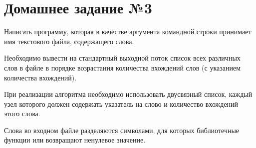\section*{Домашнее задание №3}


Написать программу, которая в качестве аргумента командной строки
принимает имя текстового файла, содержащего слова.

Необходимо
вывести на стандартный выходной поток список всех различных слов в
файле в порядке возрастания количества вхождений слов (с указанием
количества вхождений).

При реализации алгоритма необходимо
использовать двусвязный список, каждый узел которого должен
содержать указатель на слово и количество вхождений этого слова.

Слова
во входном файле разделяются символами, для которых библиотечные
функции  или  возвращают ненулевое значение.
